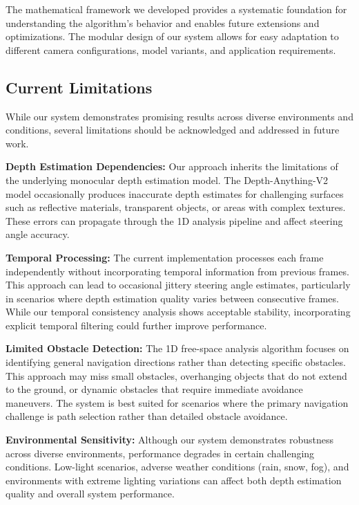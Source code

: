 \documentclass[conference]{IEEEtran}
\begin{document}
The mathematical framework we developed provides a systematic foundation for understanding the algorithm's behavior and enables future extensions and optimizations. The modular design of our system allows for easy adaptation to different camera configurations, model variants, and application requirements.

\subsection{Current Limitations}
While our system demonstrates promising results across diverse environments and conditions, several limitations should be acknowledged and addressed in future work.

\textbf{Depth Estimation Dependencies:} Our approach inherits the limitations of the underlying monocular depth estimation model. The Depth-Anything-V2 model occasionally produces inaccurate depth estimates for challenging surfaces such as reflective materials, transparent objects, or areas with complex textures. These errors can propagate through the 1D analysis pipeline and affect steering angle accuracy.

\textbf{Temporal Processing:} The current implementation processes each frame independently without incorporating temporal information from previous frames. This approach can lead to occasional jittery steering angle estimates, particularly in scenarios where depth estimation quality varies between consecutive frames. While our temporal consistency analysis shows acceptable stability, incorporating explicit temporal filtering could further improve performance.

\textbf{Limited Obstacle Detection:} The 1D free-space analysis algorithm focuses on identifying general navigation directions rather than detecting specific obstacles. This approach may miss small obstacles, overhanging objects that do not extend to the ground, or dynamic obstacles that require immediate avoidance maneuvers. The system is best suited for scenarios where the primary navigation challenge is path selection rather than detailed obstacle avoidance.

\textbf{Environmental Sensitivity:} Although our system demonstrates robustness across diverse environments, performance degrades in certain challenging conditions. Low-light scenarios, adverse weather conditions (rain, snow, fog), and environments with extreme lighting variations can affect both depth estimation quality and overall system performance.
\end{document}
